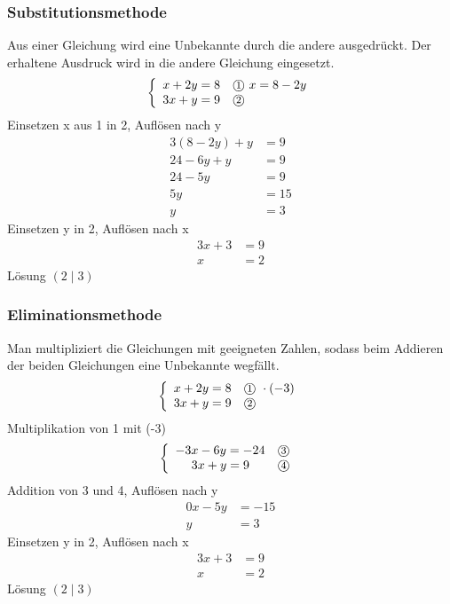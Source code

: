 \documentclass[a4paper]{article}
\begin{document}
\subsubsection{Substitutionsmethode}
Aus einer Gleichung wird eine Unbekannte durch die andere ausgedrückt. Der erhaltene Ausdruck wird in die andere Gleichung eingesetzt.
\[
\left\{
\begin{array}{ll}
x+2y=8 & \text{\textcircled{\footnotesize{1}} } x=8-2y\\
3x+y=9 & \text{\textcircled{\footnotesize{2}}}
\end{array}
\right.
\]
Einsetzen x aus \textcircled{\footnotesize{1}} in \textcircled{\footnotesize{2}}, Auflösen nach y
\begin{align*}
3(8-2y)+y&=9 \\
24-6y+y&=9 \\
24-5y&=9 \\
5y&=15 \\
y&=3
\end{align*}
Einsetzen y in \textcircled{\footnotesize{2}}, Auflösen nach x
\begin{align*}
3x+3&=9 \\
x&=2
\end{align*}
Lösung $(2\mid 3)$

\subsubsection{Eliminationsmethode}
Man multipliziert die Gleichungen mit geeigneten Zahlen, sodass beim Addieren der beiden Gleichungen eine Unbekannte wegfällt.
\[
\left\{
\begin{array}{ll}
x+2y=8 & \text{\textcircled{\footnotesize{1}} } \cdot (-3)\\
3x+y=9 & \text{\textcircled{\footnotesize{2}}}
\end{array}
\right.
\]
Multiplikation von \textcircled{\footnotesize{1}} mit (-3)
\[
\left\{
\begin{array}{ll}
-3x-6y=-24 & \text{\textcircled{\footnotesize{3}} }\\
\hspace{13pt} 3x+y=9 & \text{\textcircled{\footnotesize{4}}}
\end{array}
\right.
\]
Addition von \textcircled{\footnotesize{3}} und \textcircled{\footnotesize{4}}, Auflösen nach y
\begin{align*}
0x-5y&=-15 \\
y&=3
\end{align*}
Einsetzen y in \textcircled{\footnotesize{2}}, Auflösen nach x
\begin{align*}
3x+3&=9 \\
x&=2
\end{align*}
Lösung $(2\mid 3)$
\end{document}
